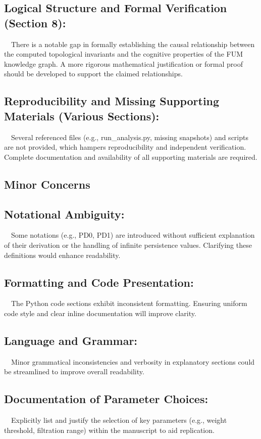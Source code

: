 \documentclass[12pt]{article}
\begin{document}
\subsection{Logical Structure and Formal Verification (Section 8):  }
 There is a notable gap in formally establishing the causal relationship between the computed topological invariants and the cognitive properties of the FUM knowledge graph. A more rigorous mathematical justification or formal proof should be developed to support the claimed relationships.

\subsection{Reproducibility and Missing Supporting Materials (Various Sections):  }
 Several referenced files (e.g., run\_analysis.py, missing snapshots) and scripts are not provided, which hampers reproducibility and independent verification. Complete documentation and availability of all supporting materials are required.

\hrulefill
\subsection{Minor Concerns}

\subsection{Notational Ambiguity:  }
 Some notations (e.g., PD0, PD1) are introduced without sufficient explanation of their derivation or the handling of infinite persistence values. Clarifying these definitions would enhance readability.

\subsection{Formatting and Code Presentation:  }
 The Python code sections exhibit inconsistent formatting. Ensuring uniform code style and clear inline documentation will improve clarity.

\subsection{Language and Grammar:  }
 Minor grammatical inconsistencies and verbosity in explanatory sections could be streamlined to improve overall readability.

\subsection{Documentation of Parameter Choices:  }
 Explicitly list and justify the selection of key parameters (e.g., weight threshold, filtration range) within the manuscript to aid replication.
\end{document}
